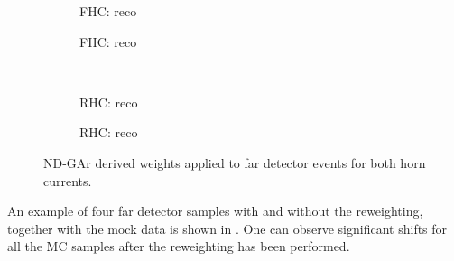 \begin{figure}[h]
	\begin{subfigure}[t]{.5\linewidth}
		\begin{adjustbox}{max totalsize=\linewidth, center}
			
		\end{adjustbox}
		\caption{FHC: reco \numu}
	\end{subfigure}
	\hfill
	\begin{subfigure}[t]{.5\linewidth}
		\begin{adjustbox}{max totalsize=\linewidth, center}
			
		\end{adjustbox}
		\caption{FHC: reco \nue}
	\end{subfigure}	\\
	\begin{subfigure}[t]{.5\linewidth}
		\begin{adjustbox}{max totalsize=\linewidth, center}
			
		\end{adjustbox}
		\caption{RHC: reco \numu}
	\end{subfigure}
	\hfill
	\begin{subfigure}[t]{.5\linewidth}
		\begin{adjustbox}{max totalsize=\linewidth, center}
			
		\end{adjustbox}
		\caption{RHC: reco \nue}
	\end{subfigure}
	\caption[ND-GAr derived weights applied to far detector events.]{ND-GAr derived weights applied to far detector events for both horn currents.}
	\label{fig:fdWeights}
\end{figure}

An example of four far detector samples with and without the reweighting, together with the mock data is shown in .
One can observe significant shifts for all the MC samples after the reweighting has been performed.

